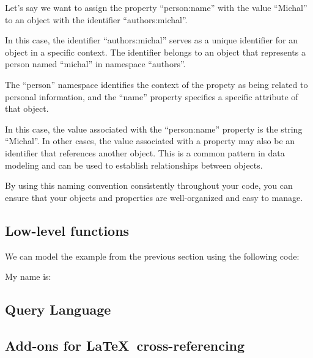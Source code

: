 \documentclass{ltxdoc}
\begin{document}
Let's say we want to assign the property \enquote{person:name} with the value \enquote{Michal}
to an object with the identifier \enquote{authors:michal}. 


In this case, the identifier \enquote{authors:michal} serves as a unique
identifier for an object in a specific context. The identifier
belongs to an object that represents a person named \enquote{michal} in namespace \enquote{authors}.

The \enquote{person} namespace identifies the context of the propety as
being related to personal information, and the \enquote{name} property specifies a
specific attribute of that object. 

In this case, the value associated with the \enquote{person:name} property is the
string \enquote{Michal}. In other cases, the value associated with a property may also
be an identifier that references another object. This is a common pattern in
data modeling and can be used to establish relationships between objects.


By using this naming convention consistently
throughout your code, you can ensure that your objects and properties are
well-organized and easy to manage.





\subsection{Low-level functions}


We can model the example from the previous section using the following code:

\begin{LTXexample}[pos=b]
  My name is: 

\end{LTXexample}


\subsection{Query Language}

\subsection{Add-ons for \LaTeX\ cross-referencing}
\end{document}
